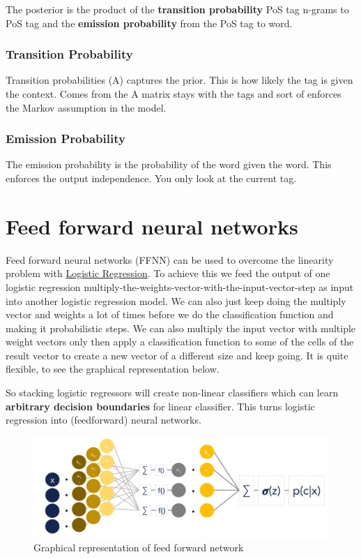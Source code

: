 \documentclass[
  11pt,
  british,
]{article}
\begin{document}
The posterior is the product of the \textbf{transition probability} PoS
tag n-grams to PoS tag and the \textbf{emission probability} from the
PoS tag to word.

\hypertarget{transition-probability}{%
\subsubsection{Transition Probability}\label{transition-probability}}

Transition probabilities (A) captures the prior. This is how likely the
tag is given the context. Comes from the A matrix stays with the tags
and sort of enforces the Markov assumption in the model.

\hypertarget{emission-probability}{%
\subsubsection{Emission Probability}\label{emission-probability}}

The emission probability is the probability of the word given the word.
This enforces the output independence. You only look at the current tag.

\hypertarget{feed-forward-neural-networks}{%
\section{Feed forward neural
networks}\label{feed-forward-neural-networks}}

Feed forward neural networks (FFNN) can be used to overcome the
linearity problem with \href{Logistic\%20Regression.md}{Logistic
Regression}. To achieve this we feed the output of one logistic
regression multiply-the-weights-vector-with-the-input-vector-step as
input into another logistic regression model. We can also just keep
doing the multiply vector and weights a lot of times before we do the
classification function and making it probabilistic steps. We can also
multiply the input vector with multiple weight vectors only then apply a
classification function to some of the cells of the result vector to
create a new vector of a different size and keep going. It is quite
flexible, to see the graphical representation below.

So stacking logistic regressors will create non-linear classifiers which
can learn \textbf{arbitrary decision boundaries} for linear classifier.
This turns logistic regression into (feedforward) neural networks.

\begin{figure}
\centering
\includegraphics{Pasted_image_20220603203033.png}
\caption{Graphical representation of feed forward network}
\end{figure}
\end{document}
